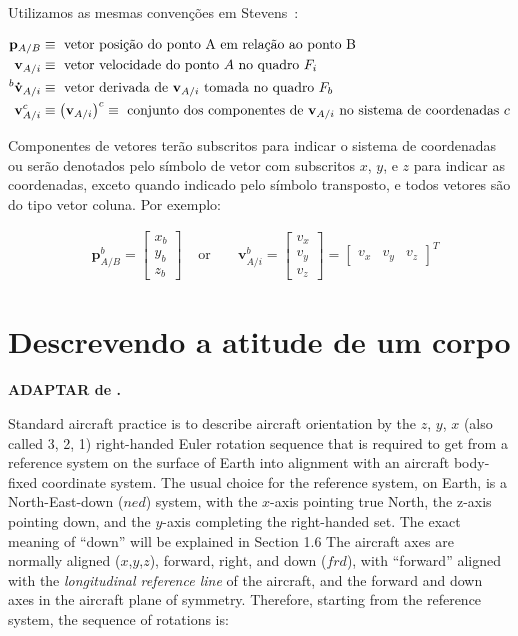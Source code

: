 Utilizamos as mesmas convenções em Stevens~\cite{Stevens2016}:

\begin{align*}
    \mathbf{p}_{A/B} &\equiv
    \text{ vetor posição do ponto A em relação ao ponto B} \\
    \mathbf{v}_{A/i} &\equiv
    \text{ vetor velocidade do ponto \(A\) no quadro \(F_{i}\)} \\
    ^{b}\mathbf{\dot{v}}_{A/i} &\equiv
    \text{ vetor derivada de \(\mathbf{v}_{A/i}\) tomada no quadro \( F_{b}\)} \\
    \mathbf{v}^{c}_{A/i} &\equiv \left( \mathbf{v}_{A/i} \right)^{c} \equiv
    \text{ conjunto dos componentes de \(\mathbf{v}_{A/i}\) no sistema de coordenadas \(c\)} \\
\end{align*}

Componentes de vetores terão subscritos para indicar o sistema de coordenadas ou serão denotados pelo símbolo de vetor com subscritos \(x\), \(y\), e \(z\) para indicar as coordenadas, exceto quando indicado pelo símbolo transposto, e todos vetores são do tipo vetor coluna. Por exemplo:

\begin{align*}
    &\mathbf{p}^{b}_{A/B} = \begin{bmatrix}x_{b} \\ y_{b} \\ z_{b}\end{bmatrix}&
    \text{ or }&
    &\mathbf{v}^{b}_{A/i} = \begin{bmatrix} v_{x} \\ v_{y} \\ v_{z} \end{bmatrix} = \begin{bmatrix} v_{x} & v_{y} & v_{z} \end{bmatrix}^{T}
\end{align*}

\section{Descrevendo a atitude de um corpo}

\textbf{ADAPTAR de .}

Standard aircraft practice is to describe aircraft orientation by
the \(z\), \(y\), \(x\) (also called 3, 2, 1) right-handed Euler
rotation sequence that is required to get from a reference system
on the surface of Earth into alignment with an aircraft body-fixed
coordinate system. The usual choice for the reference system, on
Earth, is a North-East-down (\(ned\)) system, with the \(x\)-axis
pointing true North, the z-axis pointing down, and the \(y\)-axis
completing the right-handed set. The exact meaning of ``down'' will
be explained in Section 1.6 The aircraft axes are normally aligned
(\(x\),\(y\),\(z\)), forward, right, and down (\(frd\)), with
``forward'' aligned with the \textit{longitudinal reference line}
of the aircraft, and the forward and down axes in the aircraft
plane of symmetry. Therefore, starting from the reference system,
the sequence of rotations is:

